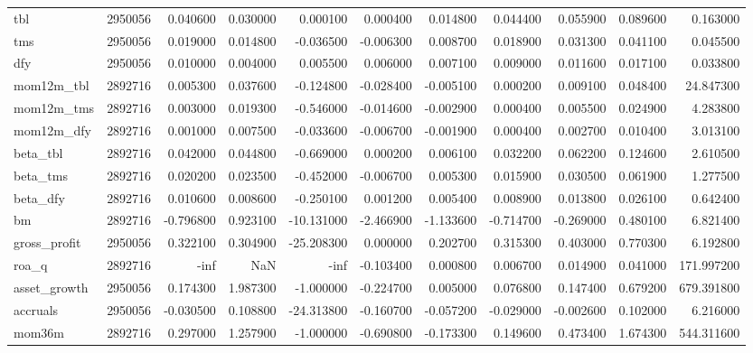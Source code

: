 \begin{table}
\begin{tabular}{lrrrrrrrrrr}
tbl & 2950056 & 0.040600 & 0.030000 & 0.000100 & 0.000400 & 0.014800 & 0.044400 & 0.055900 & 0.089600 & 0.163000 \\
tms & 2950056 & 0.019000 & 0.014800 & -0.036500 & -0.006300 & 0.008700 & 0.018900 & 0.031300 & 0.041100 & 0.045500 \\
dfy & 2950056 & 0.010000 & 0.004000 & 0.005500 & 0.006000 & 0.007100 & 0.009000 & 0.011600 & 0.017100 & 0.033800 \\
mom12m_tbl & 2892716 & 0.005300 & 0.037600 & -0.124800 & -0.028400 & -0.005100 & 0.000200 & 0.009100 & 0.048400 & 24.847300 \\
mom12m_tms & 2892716 & 0.003000 & 0.019300 & -0.546000 & -0.014600 & -0.002900 & 0.000400 & 0.005500 & 0.024900 & 4.283800 \\
mom12m_dfy & 2892716 & 0.001000 & 0.007500 & -0.033600 & -0.006700 & -0.001900 & 0.000400 & 0.002700 & 0.010400 & 3.013100 \\
beta_tbl & 2892716 & 0.042000 & 0.044800 & -0.669000 & 0.000200 & 0.006100 & 0.032200 & 0.062200 & 0.124600 & 2.610500 \\
beta_tms & 2892716 & 0.020200 & 0.023500 & -0.452000 & -0.006700 & 0.005300 & 0.015900 & 0.030500 & 0.061900 & 1.277500 \\
beta_dfy & 2892716 & 0.010600 & 0.008600 & -0.250100 & 0.001200 & 0.005400 & 0.008900 & 0.013800 & 0.026100 & 0.642400 \\
bm & 2892716 & -0.796800 & 0.923100 & -10.131000 & -2.466900 & -1.133600 & -0.714700 & -0.269000 & 0.480100 & 6.821400 \\
gross_profit & 2950056 & 0.322100 & 0.304900 & -25.208300 & 0.000000 & 0.202700 & 0.315300 & 0.403000 & 0.770300 & 6.192800 \\
roa_q & 2892716 & -inf & NaN & -inf & -0.103400 & 0.000800 & 0.006700 & 0.014900 & 0.041000 & 171.997200 \\
asset_growth & 2950056 & 0.174300 & 1.987300 & -1.000000 & -0.224700 & 0.005000 & 0.076800 & 0.147400 & 0.679200 & 679.391800 \\
accruals & 2950056 & -0.030500 & 0.108800 & -24.313800 & -0.160700 & -0.057200 & -0.029000 & -0.002600 & 0.102000 & 6.216000 \\
mom36m & 2892716 & 0.297000 & 1.257900 & -1.000000 & -0.690800 & -0.173300 & 0.149600 & 0.473400 & 1.674300 & 544.311600 \\
\bottomrule
\end{tabular}
\end{table}

